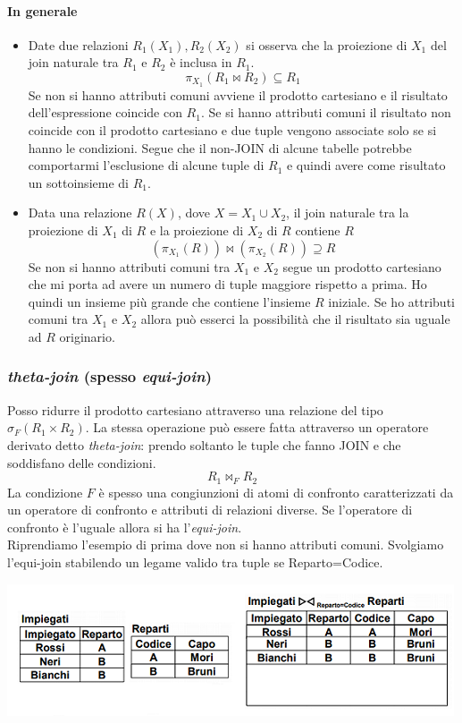 \paragraph{In generale}
\begin{itemize}
	\item Date due relazioni $R_1(X_1),R_2(X_2)$ si osserva che la proiezione di $X_1$ del join naturale tra $R_1$ e $R_2$ è inclusa in $R_1$.
	\[\pi_{X_1}(R_1\Join R_2) \subseteq R_1\]
	Se non si hanno attributi comuni avviene il prodotto cartesiano e il risultato dell'espressione coincide con $R_1$. Se si hanno attributi comuni il risultato non coincide con il prodotto cartesiano e due tuple vengono associate solo se si hanno le condizioni. Segue che il non-JOIN di alcune tabelle potrebbe comportarmi l'esclusione di alcune tuple di $R_1$ e quindi avere come risultato un sottoinsieme di $R_1$.
	\item Data una relazione $R(X)$, dove $X=X_1 \cup X_2$, il join naturale tra la proiezione di $X_1$ di $R$ e la proiezione di $X_2$ di $R$ contiene $R$
	\[(\pi_{X_1}(R))\Join(\pi_{X_2}(R))\supseteq R\]
	Se non si hanno attributi comuni tra $X_1$ e $X_2$ segue un prodotto cartesiano che mi porta ad avere un numero di tuple maggiore rispetto a prima. Ho quindi un insieme più grande che contiene l'insieme $R$ iniziale. Se ho attributi comuni tra $X_1$ e $X_2$ allora può esserci la possibilità che il risultato sia uguale ad $R$ originario.
\end{itemize}
\subsubsection{\emph{theta-join} (spesso \emph{equi-join})}
Posso ridurre il prodotto cartesiano attraverso una relazione del tipo $\sigma_F(R_1 \times R_2)$. La stessa operazione può essere fatta attraverso un operatore derivato detto \emph{theta-join}: prendo soltanto le tuple che fanno JOIN e che soddisfano delle condizioni.
\[R_1 \Join_F R_2\]
La condizione $F$ è spesso una congiunzioni di atomi di confronto caratterizzati da un operatore di confronto e attributi di relazioni diverse. Se l'operatore di confronto è l'uguale allora si ha l'\emph{equi-join}. \\
Riprendiamo l'esempio di prima dove non si hanno attributi comuni. Svolgiamo l'equi-join stabilendo un legame valido tra tuple se Reparto=Codice.
\begin{center}
	\includegraphics{images/40.PNG}
\end{center}
